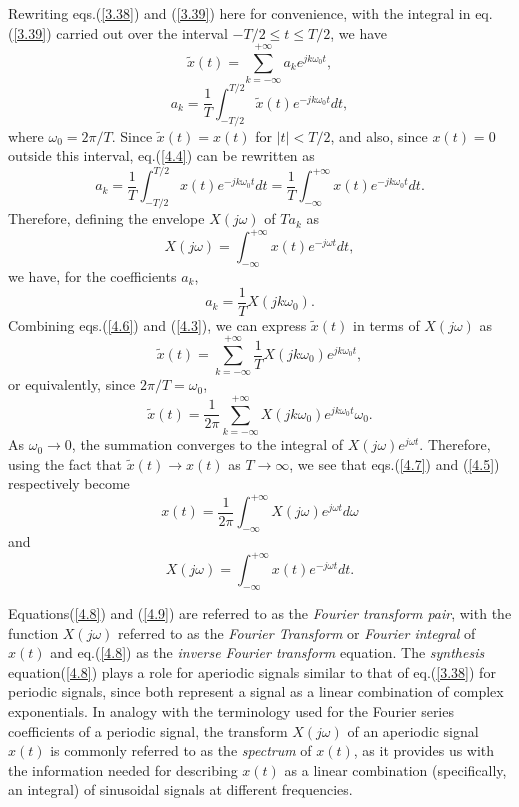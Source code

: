 \documentclass[a4paper,10pt,twoside]{book}
\begin{document}
Rewriting eqs.\;(\ref{3.38}) and (\ref{3.39}) here for convenience, with the integral in eq.\;(\ref{3.39}) carried out over the interval $-T/2\le t\le T/2$, we have
\begin{equation}
    \tilde{x}(t) = \sum_{k=-\infty}^{+\infty}a_ke^{jk\omega_0t},
    \label{4.3}
\end{equation}
\begin{equation}
    a_k = \frac{1}{T}\int_{-T/2}^{T/2}\tilde{x}(t)e^{-jk\omega_0t}dt,
    \label{4.4}
\end{equation}
where $\omega_0=2\pi/T$. Since $\tilde{x}(t)=x(t)$ for $|t|<T/2$, and also, since $x(t)=0$ outside this interval, eq.\;(\ref{4.4}) can be rewritten as $$a_k = \frac1T\int_{-T/2}^{T/2}x(t)e^{-jk\omega_0t}dt = \frac1T\int_{-\infty}^{+\infty}x(t)e^{-jk\omega_0t}dt.$$ Therefore, defining the envelope $X(j\omega)$ of $Ta_k$ as
\begin{equation}
    X(j\omega)=\int_{-\infty}^{+\infty}x(t)e^{-j\omega t}dt,
    \label{4.5}
\end{equation}
we have, for the coefficients $a_k$,
\begin{equation}
    a_k=\dfrac1TX(jk\omega_0).
    \label{4.6}
\end{equation}
Combining eqs.\;(\ref{4.6}) and (\ref{4.3}), we can express $\tilde{x}(t)$ in terms of $X(j\omega)$ as $$\tilde{x}(t) = \sum_{k = -\infty}^{+\infty}\frac{1}{T}X(jk\omega_0)e^{jk\omega_0t},$$ or equivalently, since $2\pi/T=\omega_0$,
\begin{equation}
    \tilde{x}(t)=\frac1{2\pi}\sum_{k=-\infty}^{+\infty}X(jk\omega_0)e^{jk\omega_0t}\omega_0.
    \label{4.7}
\end{equation}
As $\omega_0\to 0$, the summation converges to the integral of $X(j\omega)e^{j\omega t}$. Therefore, using the fact that $\tilde{x}(t)\to x(t)$ as $T\to\infty$, we see that eqs.\;(\ref{4.7}) and (\ref{4.5}) respectively become
\begin{equation}
    \boxed{x(t)=\frac1{2\pi}\int_{-\infty}^{+\infty}X(j\omega)e^{j\omega t}d\omega}
    \label{4.8}
\end{equation}
and
\begin{equation}
    \boxed{X(j\omega)=\int_{-\infty}^{+\infty}x(t)e^{-j\omega t}dt.}
    \label{4.9}
\end{equation}

Equations\;(\ref{4.8}) and (\ref{4.9}) are referred to as the \textit{Fourier transform pair}, with the function $X(j\omega)$ referred to as the \textit{Fourier Transform} or \textit{Fourier integral} of $x(t)$ and eq.\;(\ref{4.8}) as the \textit{inverse Fourier transform} equation. The \textit{synthesis} equation\;(\ref{4.8}) plays a role for aperiodic signals similar to that of eq.\;(\ref{3.38}) for periodic signals, since both represent a signal as a linear combination of complex exponentials. In analogy with the terminology used for the Fourier series coefficients of a periodic signal, the transform $X(j\omega)$ of an aperiodic signal $x(t)$ is commonly referred to as the \textit{spectrum} of $x(t)$, as it provides us with the information needed for describing $x(t)$ as a linear combination (specifically, an integral) of sinusoidal signals at different frequencies.
\end{document}
